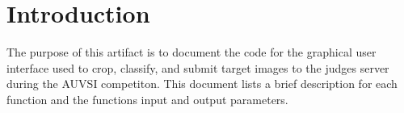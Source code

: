 \documentclass[]{auvsi_doc}
\begin{document}
\begin{AUVSITitlePage}
\begin{artifacttable}
\end{artifacttable}
\end{AUVSITitlePage}

\section{Introduction}

The purpose of this artifact is to document the code for the graphical user interface used to crop, classify, and 
submit target images to the judges server during the AUVSI competiton. This document lists a brief description for 
each function and the functions input and output parameters.



\end{document}
